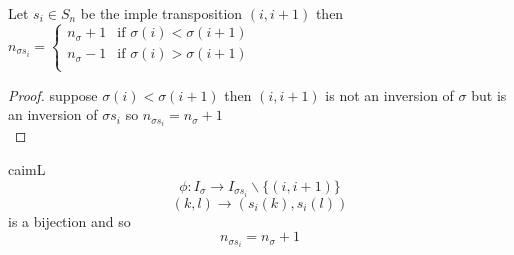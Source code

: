 \documentclass{article}
\begin{document}
\begin{lemma}[2.9.13] \leavevmode \\ 
    Let $s_i \in S_n$ be the imple transposition $(i, i+1)$ then $n_{\sigma s_i} = \begin{cases}
        n_{\sigma} + 1 & \text{if } \sigma(i) < \sigma(i+1) \\ 
        n_{\sigma} - 1 & \text{if } \sigma(i) > \sigma(i+1) \\
    \end{cases}$
\end{lemma}
\begin{proof}
    suppose $\sigma(i) < \sigma(i + 1)$ then $(i, i+1)$ is not an inversion of $\sigma$ but is an inversion of $\sigma s_i$ so $n_{\sigma s_i} = n_{\sigma} + 1$ \\
\end{proof}
caimL 
$$\phi: I_{\sigma} \rightarrow I_{\sigma s_i} \backslash \{(i, i+1)\}$$
$$(k,l) \rightarrow (s_i(k) , s_i(l) ) $$ is a bijection and so $$n_{\sigma s_i} = n_{\sigma} + 1$$
\end{document}
